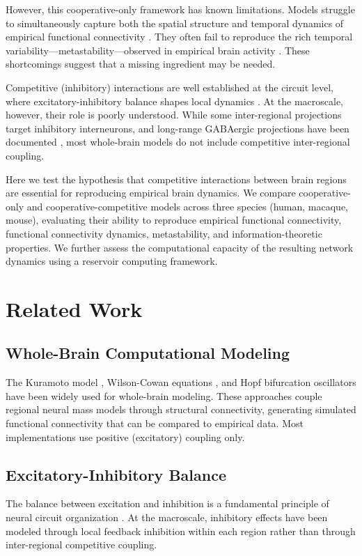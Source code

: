 \documentclass[11pt]{article}
\begin{document}
However, this cooperative-only framework has known limitations. Models struggle to simultaneously capture both the spatial structure and temporal dynamics of empirical functional connectivity \citep{cabral2017functional}. They often fail to reproduce the rich temporal variability---metastability---observed in empirical brain activity \citep{tognoli2014metastable}. These shortcomings suggest that a missing ingredient may be needed.

Competitive (inhibitory) interactions are well established at the circuit level, where excitatory-inhibitory balance shapes local dynamics \citep{brunel2000dynamics}. At the macroscale, however, their role is poorly understood. While some inter-regional projections target inhibitory interneurons, and long-range GABAergic projections have been documented \citep{caputi2013long}, most whole-brain models do not include competitive inter-regional coupling.

Here we test the hypothesis that competitive interactions between brain regions are essential for reproducing empirical brain dynamics. We compare cooperative-only and cooperative-competitive models across three species (human, macaque, mouse), evaluating their ability to reproduce empirical functional connectivity, functional connectivity dynamics, metastability, and information-theoretic properties. We further assess the computational capacity of the resulting network dynamics using a reservoir computing framework.

\section{Related Work}

\subsection{Whole-Brain Computational Modeling}
The Kuramoto model \citep{cabral2017functional}, Wilson-Cowan equations \citep{deco2011emerging}, and Hopf bifurcation oscillators \citep{deco2017dynamics} have been widely used for whole-brain modeling. These approaches couple regional neural mass models through structural connectivity, generating simulated functional connectivity that can be compared to empirical data. Most implementations use positive (excitatory) coupling only.

\subsection{Excitatory-Inhibitory Balance}
The balance between excitation and inhibition is a fundamental principle of neural circuit organization \citep{brunel2000dynamics, vogels2011inhibitory}. At the macroscale, inhibitory effects have been modeled through local feedback inhibition within each region \citep{deco2014local} rather than through inter-regional competitive coupling.
\end{document}
